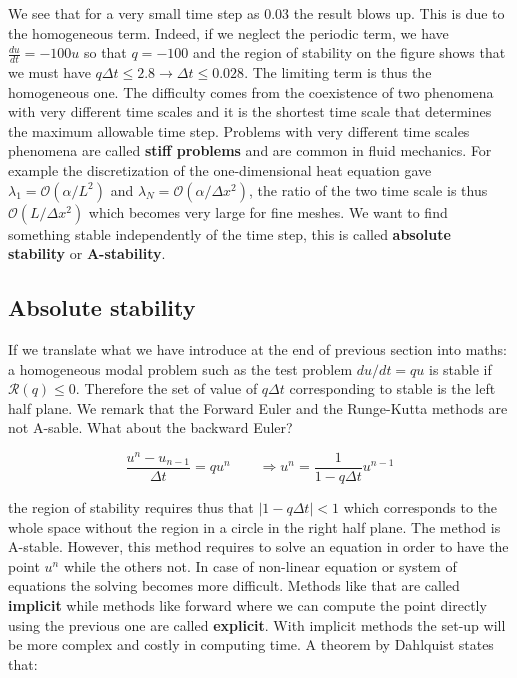 We see that for a very small time step as 0.03 the result blows up. This is due to the homogeneous term. Indeed, if we neglect the periodic term, we have $\frac{du}{dt} = -100 u$ so that $q = -100$ and the region of stability on the figure shows that we must have $q\Delta t \leq 2.8 \rightarrow \Delta t \leq 0.028$. The limiting term is thus the homogeneous one. The difficulty comes from the coexistence of two phenomena with very different time scales and it is the shortest time scale that determines the maximum allowable time step.  Problems with very different time scales phenomena are called \textbf{stiff problems} and are common in fluid mechanics. For example the discretization of the one-dimensional heat equation gave $\lambda_1 = \mathcal{O}(\alpha /L^2)$ and $\lambda_N = \mathcal{O}(\alpha /\Delta x^2)$, the ratio of the two time scale is thus $\mathcal{O}(L/\Delta x^2)$ which becomes very large for fine meshes. We want to find something stable independently of the time step, this is called \textbf{absolute stability} or \textbf{A-stability}. 

\subsection{Absolute stability}
If we translate what we have introduce at the end of previous section into maths: a homogeneous modal problem such as the test problem $du/dt = q u$ is stable if $\mathcal{R}(q)\leq0$. Therefore the set of value of $q\Delta t$ corresponding to stable  is the left half plane. We remark that the Forward Euler and the Runge-Kutta methods are not A-sable. What about the backward Euler? 

\begin{equation}
\frac{u^n-u_{n-1}}{\Delta t} = q u^n \qquad \Rightarrow u^n = \frac{1}{1 - q\Delta t} u^{n-1}
\end{equation}

the region of stability requires thus that $|1-q\Delta t| < 1$ which corresponds to the whole space without the region in a circle in the right half plane. The method is A-stable. However, this method requires to solve an equation in order to have the point $u^n$ while the others not. In case of non-linear equation or system of equations the solving becomes more difficult. Methods like that are called \textbf{implicit} while methods like forward where we can compute the point directly using the previous one are called \textbf{explicit}. With implicit methods the set-up will be more complex and costly in computing time. A theorem by Dahlquist states that: 

